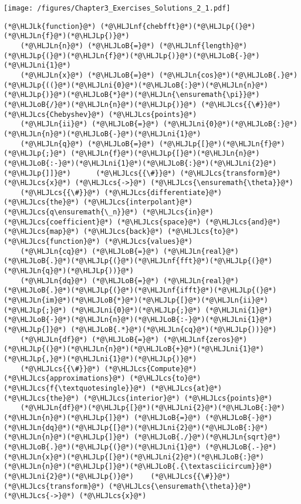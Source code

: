 \documentclass[12pt,a4paper]{article}
\newcommand{\HLJLk}[1]{\textcolor[RGB]{148,91,176}{\textbf{#1}}}
\newcommand{\HLJLn}[1]{#1}
\newcommand{\HLJLnf}[1]{\textcolor[RGB]{66,102,213}{#1}}
\newcommand{\HLJLni}[1]{\textcolor[RGB]{59,151,46}{#1}}
\newcommand{\HLJLoB}[1]{\textcolor[RGB]{102,102,102}{\textbf{#1}}}
\newcommand{\HLJLp}[1]{#1}
\newcommand{\HLJLcs}[1]{\textcolor[RGB]{153,153,119}{\textit{#1}}}
\begin{document}
\texttt{[image: /figures/Chapter3\_Exercises\_Solutions\_2\_1.pdf]}

\begin{lstlisting}
(*@\HLJLk{function}@*) (*@\HLJLnf{chebfft}@*)(*@\HLJLp{(}@*)(*@\HLJLn{f}@*)(*@\HLJLp{)}@*)
    (*@\HLJLn{n}@*) (*@\HLJLoB{=}@*) (*@\HLJLnf{length}@*)(*@\HLJLp{(}@*)(*@\HLJLn{f}@*)(*@\HLJLp{)}@*)(*@\HLJLoB{-}@*)(*@\HLJLni{1}@*)
    (*@\HLJLn{x}@*) (*@\HLJLoB{=}@*) (*@\HLJLn{cos}@*)(*@\HLJLoB{.}@*)(*@\HLJLp{((}@*)(*@\HLJLni{0}@*)(*@\HLJLoB{:}@*)(*@\HLJLn{n}@*)(*@\HLJLp{)}@*)(*@\HLJLoB{*}@*)(*@\HLJLn{\ensuremath{\pi}}@*)(*@\HLJLoB{/}@*)(*@\HLJLn{n}@*)(*@\HLJLp{)}@*) (*@\HLJLcs{{\#}}@*) (*@\HLJLcs{Chebyshev}@*) (*@\HLJLcs{points}@*)
    (*@\HLJLn{ii}@*) (*@\HLJLoB{=}@*) (*@\HLJLni{0}@*)(*@\HLJLoB{:}@*)(*@\HLJLn{n}@*)(*@\HLJLoB{-}@*)(*@\HLJLni{1}@*)
    (*@\HLJLn{q}@*) (*@\HLJLoB{=}@*) (*@\HLJLp{[}@*)(*@\HLJLn{f}@*)(*@\HLJLp{;}@*) (*@\HLJLn{f}@*)(*@\HLJLp{[}@*)(*@\HLJLn{n}@*)(*@\HLJLoB{:-}@*)(*@\HLJLni{1}@*)(*@\HLJLoB{:}@*)(*@\HLJLni{2}@*)(*@\HLJLp{]]}@*)      (*@\HLJLcs{{\#}}@*) (*@\HLJLcs{transform}@*) (*@\HLJLcs{x}@*) (*@\HLJLcs{->}@*) (*@\HLJLcs{\ensuremath{\theta}}@*)    
    (*@\HLJLcs{{\#}}@*) (*@\HLJLcs{differentiate}@*) (*@\HLJLcs{the}@*) (*@\HLJLcs{interpolant}@*) (*@\HLJLcs{q\ensuremath{\_n}}@*) (*@\HLJLcs{in}@*) (*@\HLJLcs{coefficient}@*) (*@\HLJLcs{space}@*) (*@\HLJLcs{and}@*) (*@\HLJLcs{map}@*) (*@\HLJLcs{back}@*) (*@\HLJLcs{to}@*) (*@\HLJLcs{function}@*) (*@\HLJLcs{values}@*)
    (*@\HLJLn{cq}@*) (*@\HLJLoB{=}@*) (*@\HLJLn{real}@*)(*@\HLJLoB{.}@*)(*@\HLJLp{(}@*)(*@\HLJLnf{fft}@*)(*@\HLJLp{(}@*)(*@\HLJLn{q}@*)(*@\HLJLp{))}@*)
    (*@\HLJLn{dq}@*) (*@\HLJLoB{=}@*) (*@\HLJLn{real}@*)(*@\HLJLoB{.}@*)(*@\HLJLp{(}@*)(*@\HLJLnf{ifft}@*)(*@\HLJLp{(}@*)(*@\HLJLn{im}@*)(*@\HLJLoB{*}@*)(*@\HLJLp{[}@*)(*@\HLJLn{ii}@*)(*@\HLJLp{;}@*) (*@\HLJLni{0}@*)(*@\HLJLp{;}@*) (*@\HLJLni{1}@*)(*@\HLJLoB{-}@*)(*@\HLJLn{n}@*)(*@\HLJLoB{:-}@*)(*@\HLJLni{1}@*)(*@\HLJLp{]}@*) (*@\HLJLoB{.*}@*)(*@\HLJLn{cq}@*)(*@\HLJLp{))}@*)
    (*@\HLJLn{df}@*) (*@\HLJLoB{=}@*) (*@\HLJLnf{zeros}@*)(*@\HLJLp{(}@*)(*@\HLJLn{n}@*)(*@\HLJLoB{+}@*)(*@\HLJLni{1}@*)(*@\HLJLp{,}@*)(*@\HLJLni{1}@*)(*@\HLJLp{)}@*)
    (*@\HLJLcs{{\#}}@*) (*@\HLJLcs{Compute}@*) (*@\HLJLcs{approximations}@*) (*@\HLJLcs{to}@*) (*@\HLJLcs{f{\textquotesingle}}@*) (*@\HLJLcs{at}@*) (*@\HLJLcs{the}@*) (*@\HLJLcs{interior}@*) (*@\HLJLcs{points}@*)
    (*@\HLJLn{df}@*)(*@\HLJLp{[}@*)(*@\HLJLni{2}@*)(*@\HLJLoB{:}@*)(*@\HLJLn{n}@*)(*@\HLJLp{]}@*) (*@\HLJLoB{=}@*) (*@\HLJLoB{-}@*)(*@\HLJLn{dq}@*)(*@\HLJLp{[}@*)(*@\HLJLni{2}@*)(*@\HLJLoB{:}@*)(*@\HLJLn{n}@*)(*@\HLJLp{]}@*) (*@\HLJLoB{./}@*)(*@\HLJLn{sqrt}@*)(*@\HLJLoB{.}@*)(*@\HLJLp{(}@*)(*@\HLJLni{1}@*) (*@\HLJLoB{.-}@*) (*@\HLJLn{x}@*)(*@\HLJLp{[}@*)(*@\HLJLni{2}@*)(*@\HLJLoB{:}@*)(*@\HLJLn{n}@*)(*@\HLJLp{]}@*)(*@\HLJLoB{.{\textasciicircum}}@*)(*@\HLJLni{2}@*)(*@\HLJLp{)}@*)    (*@\HLJLcs{{\#}}@*) (*@\HLJLcs{transform}@*) (*@\HLJLcs{\ensuremath{\theta}}@*) (*@\HLJLcs{->}@*) (*@\HLJLcs{x}@*)   

\end{lstlisting}
\end{document}
